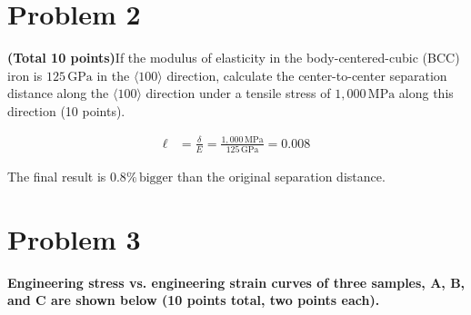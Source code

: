 \documentclass[10pt]{article}
\begin{document}
\section*{Problem 2}

\noindent \textbf{(Total 10 points)}If the modulus of elasticity in the body-centered-cubic (BCC) iron is \(125 \, \text{GPa}\) in the \(\langle 100 \rangle\) direction, calculate the center-to-center separation distance along the \(\langle 100 \rangle\) direction under a tensile stress of \(1,000 \, \text{MPa}\) along this direction (10 points).

\begin{align*}
    \ell &= \frac{\delta}{E} = \frac{1,000 \, \text{MPa}}{125 \, \text{GPa}} = 0.008
\end{align*}

\noindent The final result is \(0.8\% \, \text{bigger}\) than the original separation distance.

\newpage
\section*{Problem 3}

\noindent \textbf{Engineering stress vs. engineering strain curves of three samples, A, B, and C are shown below (10 points total, two points each).}
\end{document}
